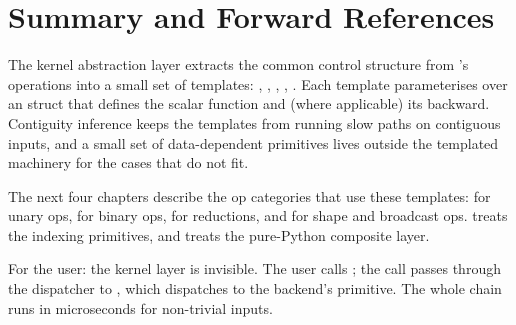 \section{Summary and Forward References}
\label{sec:kernel_abstraction:summary}

The kernel abstraction layer extracts the common control structure
from \Lucid's operations into a small set of templates:
, , ,
, . Each template
parameterises over an  struct that defines the scalar
function and (where applicable) its backward. Contiguity inference
keeps the templates from running slow paths on contiguous inputs,
and a small set of data-dependent primitives lives outside the
templated machinery for the cases that do not fit.

The next four chapters describe the op categories that use these
templates:  for unary ops,
 for binary ops, 
for reductions, and  for shape and broadcast
ops.  treats the indexing primitives, and
 treats the pure-Python composite layer.

\begin{lucidnote}
For the user: the kernel layer is invisible. The user calls
; the call passes through the dispatcher to
, which dispatches to the backend's
 primitive. The whole chain runs in microseconds for
non-trivial inputs.
\end{lucidnote}
